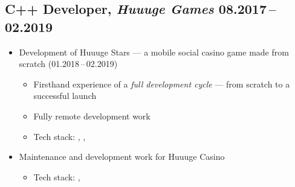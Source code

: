 \documentclass[a4paper,10pt]{article}
\begin{document}
\vspace{18pt}
\subsection{C++ Developer, \textit{Huuuge Games} \hfill 08.2017\,--\,02.2019}
\begin{itemize}[leftmargin=15pt,itemsep=3pt]
  \item Development of Huuuge Stars --- a mobile social casino game made from scratch
        \hfill (01.2018\,--\,02.2019)
  \begin{itemize}
    \item Firsthand experience of a \textit{full development cycle} ---
          from scratch to a successful launch
    \item Fully remote development work
    \item Tech stack: , , 
  \end{itemize}
  \item Maintenance and development work for Huuuge Casino
  \begin{itemize}
    \item Tech stack: , 
  \end{itemize}
\end{itemize}

\vspace{18pt}
\end{document}

